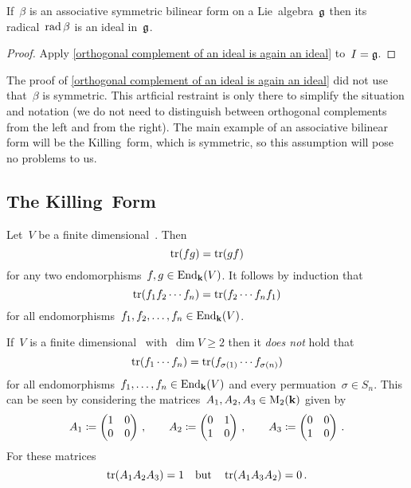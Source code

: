 \begin{corollary}
  \label{radical of bilinear form is an ideal}
  If~$\beta$ is an associative symmetric bilinear form on a Lie~algebra~$\mathfrak{g}$ then its radical~$\operatorname{rad} \beta$ is an ideal in~$\mathfrak{g}$.
\end{corollary}


\begin{proof}
  Apply \cref{orthogonal complement of an ideal is again an ideal} to~$I = \mathfrak{g}$.
\end{proof}


\begin{remark}
 The proof of \ref{orthogonal complement of an ideal is again an ideal} did not use that~$\beta$ is symmetric.
 This artficial restraint is only there to simplify the situation and notation (we do not need to distinguish between orthogonal complements from the left and from the right).
 The main example of an associative bilinear form will be the Killing~form, which is symmetric, so this assumption will pose no problems to us.
\end{remark}





\subsection{The Killing~Form}


\begin{recall}
  \label{symmetric property of trace}
  Let~$V$ be a finite dimensional~{\vectorspace{$\kf$}}.
  Then
  \[
    \operatorname{tr}(f g)
    =
    \operatorname{tr}(g f)
  \]
  for any two endomorphisms~$f, g \in \operatorname{End}_{\mathbf{k}}(V)$.
  It follows by induction that
  \[
    \operatorname{tr}(f_1 f_2 \dotsm f_n)
    =
    \operatorname{tr}(f_2 \dotsm f_n f_1)
  \]
  for all endomorphisms~$f_1, f_2, \dotsc, f_n \in \operatorname{End}_{\mathbf{k}}(V)$.
\end{recall}


\begin{warning}
  If~$V$ is a finite dimensional~{\vectorspace{$\kf$}} with~$\dim V \geq 2$ then it \emph{does not} hold that
  \[
    \operatorname{tr}(f_1 \dotsm f_n)
    =
    \operatorname{tr}(f_{\sigma(1)} \dotsm f_{\sigma(n)})
  \]
  for all endomorphisms~$f_1, \dotsc, f_n \in \operatorname{End}_{\mathbf{k}}(V)$ and every permuation~$\sigma \in S_n$.
  This can be seen by considering the matrices~$A_1, A_2, A_3 \in \operatorname{M}_2(\mathbf{k})$ given by
  \[
    A_1
    \coloneqq
    \begin{pmatrix}
      1 & 0 \\
      0 & 0
    \end{pmatrix} \,,
    \qquad
    A_2
    \coloneqq
    \begin{pmatrix}
      0 & 1 \\
      1 & 0
    \end{pmatrix} \,,
    \qquad
    A_3
    \coloneqq
    \begin{pmatrix}
      0 & 0 \\
      1 & 0
    \end{pmatrix} \,.
  \]
  For these matrices
  \[
    \operatorname{tr}(A_1 A_2 A_3)
    =
    1
    \quad\text{but}\quad
    \operatorname{tr}(A_1 A_3 A_2)
    =
    0 \,.
  \]
\end{warning}


